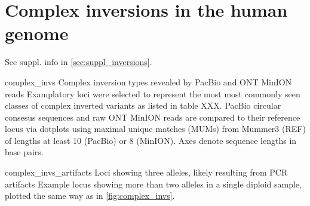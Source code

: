 \chapter{Complex inversions in the human genome}
\label{sec:inversions}

See suppl. info in \cref{sec:suppl_inversions}.

    {complex_invs}
    {Complex inversion types revealed by PacBio and ONT MinION reads}
    {Examplatory loci were selected to represent the most most commonly seen
    classes of complex inverted variants as listed in table XXX. PacBio circular
    consesus sequences and raw ONT MinION reads are compared to their reference
    locus via dotplots using maximal unique matches (MUMs) from Mummer3 (REF) of
    lengths at least 10 (PacBio) or 8 (MinION). Axes denote sequence lengths in
    base pairs.}

    {complex_invs_artifacts}
    {Loci showing three alleles, likely resulting from PCR artifacts}
    {Example locus showing more than two alleles in a single diploid sample,
    plotted the same way as in \cref{fig:complex_invs}.}
